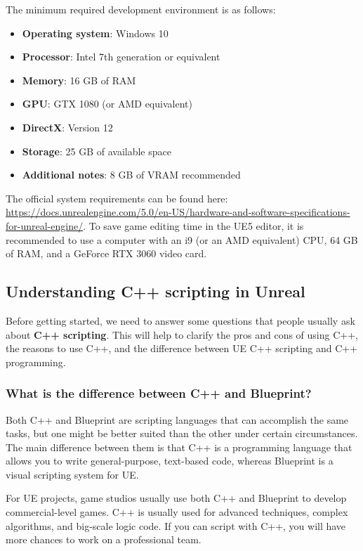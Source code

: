 \documentclass[11pt]{article} %
\begin{document}
The minimum required development environment is as follows:

\begin{itemize}
\item \textbf{Operating system}: Windows 10
\item \textbf{Processor}: Intel 7th generation or equivalent
\item \textbf{Memory}: 16 GB of RAM
\item \textbf{GPU}: GTX 1080 (or AMD equivalent)
\item \textbf{DirectX}: Version 12
\item \textbf{Storage}: 25 GB of available space
\item \textbf{Additional notes}: 8 GB of VRAM recommended
\end{itemize}

The official system requirements can be found here: \url{https://docs.unrealengine.com/5.0/en-US/hardware-and-software-specifications-for-unreal-engine/}. To save game editing time in the UE5 editor, it is recommended to use a computer with an i9 (or an AMD equivalent) CPU, 64 GB of RAM, and a GeForce RTX 3060 video card.

\subsection*{Understanding C++ scripting in Unreal}

Before getting started, we need to answer some questions that people usually ask about \textbf{C++ scripting}. This will help to clarify the pros and cons of using C++, the reasons to use C++, and the difference between UE C++ scripting and C++ programming.

\subsubsection*{What is the difference between C++ and Blueprint?}

Both C++ and Blueprint are scripting languages that can accomplish the same tasks, but one might be better suited than the other under certain circumstances. The main difference between them is that C++ is a programming language that allows you to write general-purpose, text-based code, whereas Blueprint is a visual scripting system for UE.

For UE projects, game studios usually use both C++ and Blueprint to develop commercial-level games. C++ is usually used for advanced techniques, complex algorithms, and big-scale logic code. If you can script with C++, you will have more chances to work on a professional team.
\end{document}
